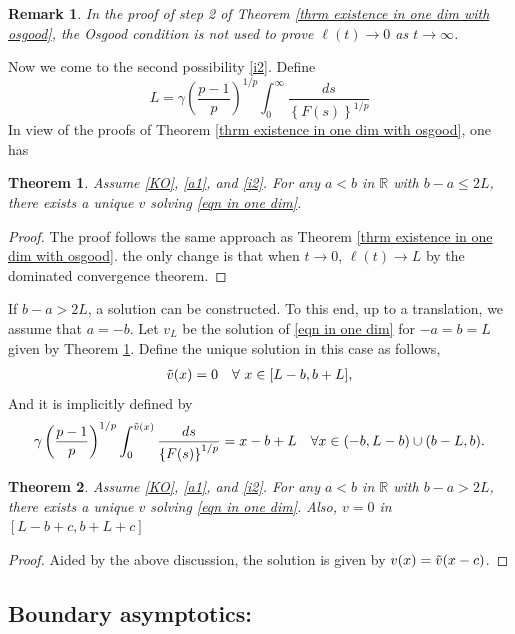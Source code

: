 \documentclass[11pt]{amsart}
\newtheorem{theorem}{Theorem}[section]
\newtheorem{remark}{Remark}
\newcommand{\R}{\mathbb{R}}
\numberwithin{equation}{section}
\begin{document}
  \begin{remark}
    In the proof of step 2 of Theorem \ref{thrm existence in one dim with osgood}, the Osgood condition is not used to prove $\ell(t)\to 0$ as $t\to \infty$.
 \end{remark}
 Now we come to the second possibility \ref{i2}. Define 
 \begin{equation*}
     L=\gamma \left(\frac{p-1}{p}\right)^{1/p}\int_{0}^{\infty} \frac{ds}{\left\{F(s)\right\}^{1/p}}
 \end{equation*}
 In view of the proofs of Theorem \ref{thrm existence in one dim with osgood}, one has
 \begin{theorem}\label{thrm existence without osgood}
     Assume \ref{KO}, \ref{a1}, and \ref{i2}. For any $a<b$ in $\R$ with $b-a\leq 2L$, there exists a unique $v$ solving \eqref{eqn in one dim}.
 \end{theorem} 
 \begin{proof}
     The proof follows the same approach as Theorem \ref{thrm existence in one dim with osgood}. the only change is that when $t\to 0$, $\ell(t)\to L$ by  the dominated convergence theorem.
 \end{proof}
 If $b-a>2L$, a solution can be constructed. To this end, up to a translation, we assume that $a=-b$. Let $v_{L}$
be the solution of \eqref{eqn in one dim} for $-a=b=L$ given by Theorem \ref{thrm existence without osgood}. Define the unique solution in this case as follows,
\begin{align*}
      \Tilde{v}(x)=0 \quad \forall~x\in [L-b,b+L],
  \end{align*}
 And it is implicitly defined by
 \begin{align*}
     \gamma\left(\frac{p-1}{p}\right)^{1/p}\int_{0}^{\Tilde{v}(x)}\frac{ds}{\left\{F(s)\right\}^{1/p}}=x-b+L \quad \forall x\in (-b, L-b)\cup (b-L, b).
 \end{align*}
\begin{theorem}
      Assume \ref{KO}, \ref{a1}, and \ref{i2}. For any $a<b$ in $\R$ with $b-a> 2L$, there exists a unique $v$ solving \eqref{eqn in one dim}. Also, $v=0$ in $[L-b+c,b+L+c]$
\end{theorem}
\begin{proof}
    Aided by the above discussion, the solution is given by $v(x)=\Tilde{v}(x-c)$.
\end{proof}
\subsection{Boundary asymptotics:}
\end{document}
